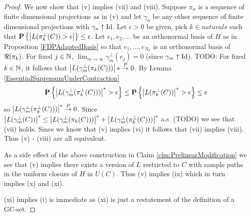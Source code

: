 \begin{proof}
We now show that (v) implies (vii) and (viii).  Suppose $\pi_n$ is a sequence of finite dimensional projections as in (v) and let 
$\gamma_n$ be any other sequence of finite dimensional projections with $\gamma_n \uparrow \operatorname*{Id}$.  Let $\epsilon > 0$ be given, pick $k \in naturals$ such that $\textbf{P}\left \{\left \vert L(\pi_k^\perp(C)) > \epsilon \right \vert \right \} \leq \epsilon$.  Let $e_1, e_2, \dotsc$ be an orthonormal
basis of $H$ as in Proposition \ref{FDPAdaptedBasis} so that $e_1, \dotsc, e_{N_k}$ is an orthonormal basis of $\Re(\pi_k)$.  For fixed $j \in \mathbb{N}$, $\lim_{m \to \infty} \gamma_m^\perp(e_j) = 0$ (since $\gamma_m \uparrow \operatorname*{Id}$).  TODO: For fixed $k \in \mathbb{N}$, it follows that $\left \vert L(\gamma_m^\perp(\pi_k(C))) \right \vert* \overset{P}\to 0$.  By Lemma \ref{EssentialSupremumUnderContraction}
\begin{align*}
\textbf{P}\left \{\left \vert L(\gamma_m^\perp(\pi_k^\perp(C))) \right \vert^* > \epsilon \right \} \leq \textbf{P}\left \{\left \vert L(\pi_k^\perp(C)) \right \vert^* > \epsilon \right \} \leq \epsilon
\end{align*}
so $\left \vert L(\gamma_m^\perp(\pi_k^\perp(C))) \right \vert^* \overset{P}\to 0$.
Since $\left \vert L(\gamma_m^\perp(C)) \right \vert^* \leq \left \vert L(\gamma_m^\perp(\pi_k(C))) \right \vert^* + \left \vert L(\gamma_m^\perp(\pi_k^\perp(C))) \right \vert^*$ a.s. (TODO) we see that
(vii) holds.  Since we know that (v) implies (vi) it follows that (vii) implies (viii).  Thus (v) - (viii) are all equivalent.

As a side effect of the above construction in Claim \ref{clm:PrelinearModification} we see that (v) implies there exists a version of $L$ restricted to $C$ with sample paths in the uniform closure of $H$ in $U(C)$.  Thus (v) implies (ix) which in turn implies (x) and (xi).

(xi) implies (i) is immediate as (xi) is just a restatement of the definition of a GC-set.


\end{proof}
